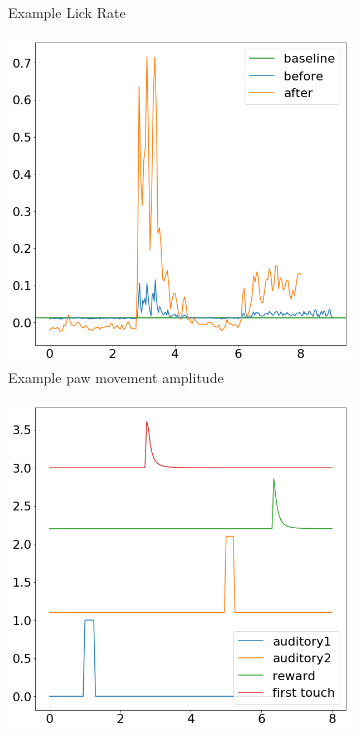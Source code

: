 \documentclass[a4paper,10pt]{article}
\begin{document}
\begin{figure}
\begin{subfigure}[b]{0.4\textwidth}
        \caption{Example Lick Rate}
        \label{fig:example_lick_rate_resampled}
    \end{subfigure}
    \begin{subfigure}[b]{0.4\textwidth}
        \includegraphics[width=\textwidth]{img/example_paw_move_resampled.png}
        \caption{Example paw movement amplitude}
        \label{fig:example_paw_move_resampled}
    \end{subfigure}\hspace{0.05\textwidth}
    \begin{subfigure}[b]{0.4\textwidth}
        \includegraphics[width=\textwidth]{img/example_behav_signal.png}

\end{subfigure}
\end{figure}
\end{document}
